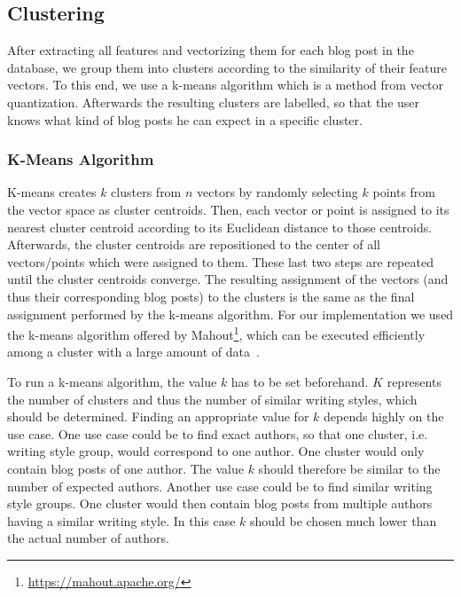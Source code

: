 
\subsection{Clustering}
\label{sec:clustering}

After extracting all features and vectorizing them for each blog post in the database, we group them into clusters according to the similarity of their feature vectors.
To this end, we use a k-means algorithm which is a method from vector quantization.
Afterwards the resulting clusters are labelled, so that the user knows what kind of blog posts he can expect in a specific cluster.

\subsubsection{K-Means Algorithm}
\label{sec:k-means}
K-means creates $k$ clusters from $n$ vectors by randomly selecting $k$ points from the vector space as cluster centroids.
Then, each vector or point is assigned to its nearest cluster centroid according to its Euclidean distance to those centroids.
Afterwards, the cluster centroids are repositioned to the center of all vectors/points which were assigned to them.
These last two steps are repeated until the cluster centroids converge.
The resulting assignment of the vectors (and thus their corresponding blog posts) to the clusters is the same as the final assignment performed by the k-means algorithm.
For our implementation we used the k-means algorithm offered by Mahout\footnote{\url{https://mahout.apache.org/}}, which can be executed efficiently among a cluster with a large amount of data~\cite{esteves2011k}.

To run a k-means algorithm, the value $k$ has to be set beforehand.
$K$ represents the number of clusters and thus the number of similar writing styles, which should be determined.
Finding an appropriate value for $k$ depends highly on the use case.
One use case could be to find exact authors, so that one cluster, i.e. writing style group, would correspond to one author.
One cluster would only contain blog posts of one author.
The value $k$ should therefore be similar to the number of expected authors.
Another use case could be to find similar writing style groups.
One cluster would then contain blog posts from multiple authors having a similar writing style.
In this case $k$ should be chosen much lower than the actual number of authors.


